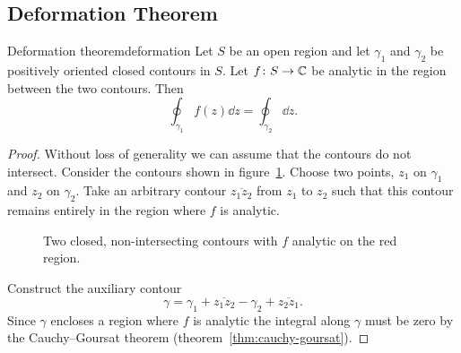 \documentclass{article}
\begin{document}
    \subsection{Deformation Theorem}
    \begin{theorem}{Deformation theorem}{deformation}
        Let \(S\) be an open region and let \(\gamma_1\) and \(\gamma_2\) be positively oriented closed contours in \(S\).
        Let \(f\colon S\to\mathbb{C}\) be analytic in the region between the two contours.
        Then
        \[\oint_{\gamma_1} f(z)\dd{z} = \oint_{\gamma_2}\dd{z}.\]
    \end{theorem}
    \begin{proof}
        Without loss of generality we can assume that the contours do not intersect.
        Consider the contours shown in figure~\ref{fig:contour for deformation theorem}.
        Choose two points, \(z_1\) on \(\gamma_1\) and \(z_2\) on \(\gamma_2\).
        Take an arbitrary contour \(\overline{z_1z_2}\) from \(z_1\) to \(z_2\) such that this contour remains entirely in the region where \(f\) is analytic.
        \begin{figure}[ht]
            \centering
            \tikzexternalenable
            \tikzexternaldisable
            \caption{Two closed, non-intersecting contours with \(f\) analytic on the red region.}
            \label{fig:contour for deformation theorem}
        \end{figure}
        Construct the auxiliary contour
        \[\gamma = \gamma_1 + \overline{z_1z_2} - \gamma_2 + \overline{z_2z_1}.\]
        Since \(\gamma\) encloses a region where \(f\) is analytic the integral along \(\gamma\) must be zero by the Cauchy--Goursat theorem (theorem~\ref{thm:cauchy-goursat}).

\end{proof}
\end{document}
